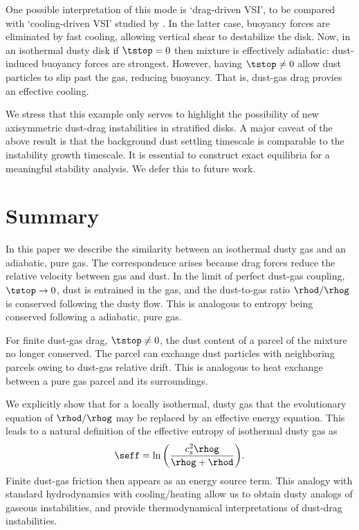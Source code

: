 One possible interpretation of this mode is `drag-driven VSI', to be 
compared with `cooling-driven VSI' studied by \cite{lin15}. In the
latter case, buoyancy forces are eliminated by fast
cooling, allowing vertical shear to destabilize the disk. Now, in an
isothermal dusty disk if $\tstop=0$ then mixture is 
effectively adiabatic: dust-induced buoyancy forces are
strongest. However, having $\tstop\neq0$ allow dust particles to slip
past the gas, reducing buoyancy. That is, dust-gas drag
provies an effective cooling. 

We stress that this example only serves to highlight
the possibility of new axisymmetric dust-drag instabilities in
stratified disks. A major caveat of the above result is that 
 the background dust settling timescale is comparable to the instability
growth timescale. It is essential to construct
exact equilibria for a meaningful stability analysis. We defer this
to future work.  


\section{Summary}\label{summary}
In this paper we describe the similarity between an isothermal 
dusty gas and an adiabatic, pure gas. The correspondence arises
because drag forces reduce the relative velocity between gas and
dust. In the limit of perfect dust-gas coupling, $\tstop \to 0$,  
 dust is entrained in 
the gas, and the dust-to-gas ratio $\rhod/\rhog$ is conserved
following the dusty flow. This is analogous to entropy being conserved
following a adiabatic, pure gas. 

For finite dust-gas drag, $\tstop\neq 0$, the dust content of a 
parcel of the mixture no longer conserved. The parcel 
can exchange dust particles with neighboring parcels owing 
to dust-gas relative drift. This is analogous to heat exchange between
a pure gas parcel and its surroundings. 

We explicitly show that for a locally isothermal, dusty gas that the 
evolutionary equation of  $\rhod/\rhog$ may be replaced by an 
effective energy equation. This leads to a 
natural definition of the effective entropy of isothermal dusty gas as  
\begin{align*}
  \seff  = \ln{\left(\frac{c_s^2\rhog}{\rhog+\rhod}\right)}.  
\end{align*}
Finite dust-gas friction then appears as an energy
source term.  This analogy with standard 
hydrodynamics with cooling/heating allow us to obtain dusty analogs of gaseous
instabilities, and provide thermodynamical interpretations of  
dust-drag instabilities. 


